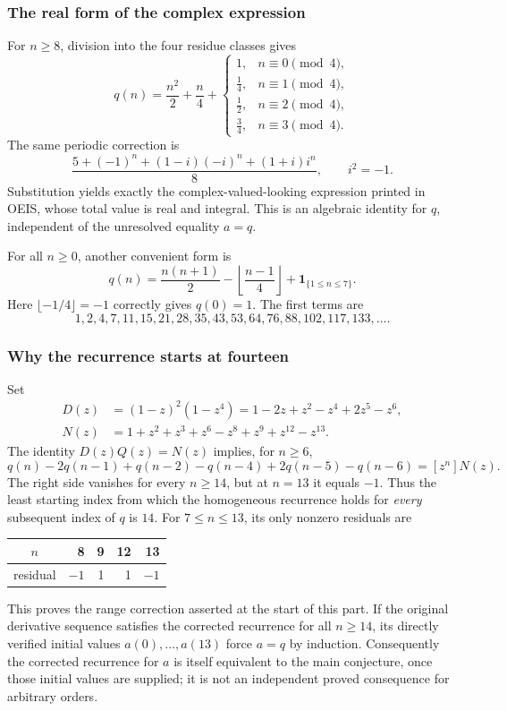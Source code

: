 \documentclass[11pt,a4paper]{article}
\numberwithin{equation}{section}
\theoremstyle{definition}
\theoremstyle{remark}
\theoremstyle{plain}
\newcommand{\coef}[2]{[#1^{#2}]}
\newcommand{\ind}[1]{\mathbf{1}_{\{#1\}}}
\begin{document}
\subsubsection{The real form of the complex expression}
For $n\ge8$, division into the four residue classes gives
\begin{equation}\label{xx:eq:residueq}
 q(n)=\frac{n^2}{2}+\frac n4+
 \begin{cases}
 1,&n\equiv0\pmod4,\\
 \tfrac14,&n\equiv1\pmod4,\\
 \tfrac12,&n\equiv2\pmod4,\\
 \tfrac34,&n\equiv3\pmod4.
 \end{cases}
\end{equation}
The same periodic correction is
\[
 \frac{5+(-1)^n+(1-i)(-i)^n+(1+i)i^n}{8},\qquad i^2=-1.
\]
Substitution yields exactly the complex-valued-looking expression printed
in OEIS, whose total value is real and integral. This is an algebraic
identity for $q$, independent of the unresolved equality $a=q$.

For all $n\ge0$, another convenient form is
\[
 q(n)=\frac{n(n+1)}2-\left\lfloor\frac{n-1}{4}\right\rfloor
                         +\ind{1\le n\le7}.
\]
Here $\lfloor-1/4\rfloor=-1$ correctly gives $q(0)=1$.
The first terms are
\[
 1,2,4,7,11,15,21,28,35,43,53,64,76,88,102,117,133,\ldots.
\]

\subsubsection{Why the recurrence starts at fourteen}
Set
\begin{align*}
 D(z)&=(1-z)^2(1-z^4)=1-2z+z^2-z^4+2z^5-z^6,\\
 N(z)&=1+z^2+z^3+z^6-z^8+z^9+z^{12}-z^{13}.
\end{align*}
The identity $D(z)Q(z)=N(z)$ implies, for $n\ge6$,
\begin{equation}\label{xx:eq:inhomogeneous}
 q(n)-2q(n-1)+q(n-2)-q(n-4)+2q(n-5)-q(n-6)
 =\coef{z}{n}N(z).
\end{equation}
The right side vanishes for every $n\ge14$, but at $n=13$ it equals $-1$.
Thus the least starting index from which the homogeneous recurrence holds
for \emph{every} subsequent index of $q$ is $14$.
For $7\le n\le13$, its only nonzero residuals are
\begin{center}
\begin{tabular}{c|rrrr}
$n$&8&9&12&13\\\hline
residual&$-1$&1&1&$-1$
\end{tabular}
\end{center}
This proves the range correction asserted at the start of this part.
If the original derivative sequence satisfies the corrected recurrence
for all $n\ge14$, its directly verified initial values $a(0),\ldots,a(13)$
force $a=q$ by induction. Consequently the corrected recurrence for $a$
is itself equivalent to the main conjecture, once those initial values
are supplied; it is not an independent proved consequence for arbitrary
orders.
\end{document}
